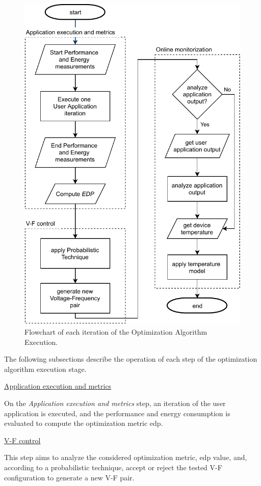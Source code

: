 \begin{figure}[h]
  \centering
  \includegraphics[height=0.95\textwidth]{Figures/Optimization/flowchart.pdf}
  \caption{Flowchart of each iteration of the Optimization Algorithm Execution.}
  \label{fig:flowchart}
\end{figure}

The following subsections describe the operation of each step of the optimization algorithm execution stage.

\bigskip
\noindent\underline{Application execution and metrics}
\bigskip

On the \textit{Application execution and metrics} step, an iteration of the user application is executed, and the performance and energy consumption is evaluated to compute the optimization metric \acrshort{edp}. 

\bigskip
\noindent\underline{V-F control}
\bigskip


This step aims to analyze the considered optimization metric, \acrshort{edp} value, and, according to a probabilistic technique, accept or reject the tested V-F configuration to generate a new V-F pair.

